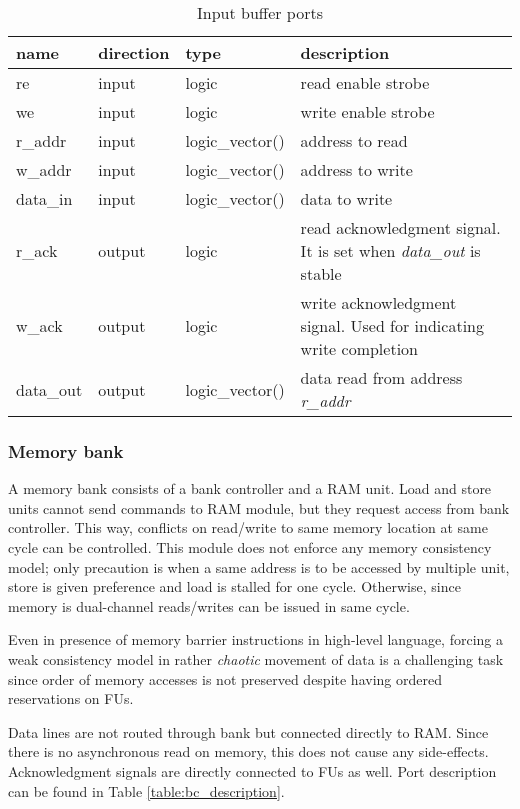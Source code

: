 	
	\begin{table}[htbp]
		\begin{tabular}{| l| l | l | p{7cm} |}
			\hline
			\textbf{name} & \textbf{direction} & \textbf{type} &  \textbf{description}\\ \hline
			re & input & logic & read enable strobe \\ \hline
			we & input & logic & write enable strobe \\ \hline
			r\_addr & input & logic\_vector(\bankAddrL) & address to read \\ \hline
			w\_addr & input & logic\_vector(\bankAddrL) & address to write \\ \hline
			data\_in & input & logic\_vector(\memWordL) & data to write \\ \hline
			r\_ack & output & logic & read acknowledgment signal. It is set when \textit{data\_out} is stable \\ \hline
			w\_ack & output & logic & write acknowledgment signal. Used for indicating write completion \\ \hline
			data\_out & output & logic\_vector(\memWordL) & data read from address \textit{r\_addr} \\ \hline
			
		\end{tabular}
		\caption{Input buffer ports \label{table:ram_description}}
		\centering
		\end{table}
	
	\subsubsection{Memory bank}
	A memory bank consists of a bank controller and a RAM unit. Load and store units cannot send commands to RAM module, but they request access from bank controller. This way, conflicts on read/write to same memory location at same cycle can be controlled. This module does not enforce any memory consistency model; only precaution is when a same address is to be accessed by multiple unit, store is given preference and load is stalled for one cycle. Otherwise, since memory is dual-channel reads/writes can be issued in same cycle.
	
	Even in presence of memory barrier instructions in high-level language, forcing a weak consistency model in rather \textit{chaotic} movement of data is a challenging task since order of memory accesses is not preserved despite having ordered reservations on FUs. 
	
	Data lines are not routed through bank but connected directly to RAM. Since there is no asynchronous read on memory, this does not cause any side-effects. Acknowledgment signals are directly connected to FUs as well. Port description can be found in Table \ref{table:bc_description}.
	
